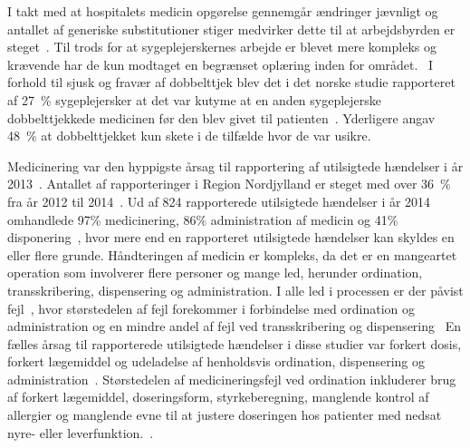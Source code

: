 I takt med at hospitalets medicin opgørelse gennemgår ændringer jævnligt og antallet af generiske  substitutioner stiger medvirker dette til at arbejdsbyrden er steget~\citep{Hakonsen2010}. Til trods for at sygeplejerskernes arbejde er blevet mere kompleks og krævende har de kun modtaget en begrænset oplæring inden for området.~\citep{Hakonsen2010} I forhold til sjusk og fravær af dobbelttjek blev det i det norske studie rapporteret af 27~\% sygeplejersker at det var kutyme at en anden sygeplejerske dobbelttjekkede medicinen før den blev givet til patienten~\citep{Hakonsen2010}. Yderligere angav 48~\% at dobbelttjekket kun skete i de tilfælde hvor de var usikre.~\citep{Hakonsen2010} 

Medicinering var den hyppigste årsag til rapportering af utilsigtede hændelser i år 2013~\citep{Patientombuddet2013}. Antallet af rapporteringer i Region Nordjylland er steget med over 36~\% fra år 2012 til 2014~\citep{Jensen2014}. Ud af 824 rapporterede utilsigtede hændelser i år 2014 omhandlede 97\% medicinering, 86\% administration af medicin og 41\% disponering~\citep{Jensen2014}, hvor mere end en rapporteret  utilsigtede hændelser kan skyldes en eller flere grunde. 
Håndteringen af medicin er kompleks, da det er en mangeartet operation som involverer flere personer og mange led, herunder ordination, transskribering, dispensering og administration. I alle led i processen er der påvist fejl~\citep{Barker2002,Sundhedsstyrelsen2005, Lisby2005, Tully2009}, hvor størstedelen af fejl forekommer i forbindelse med ordination og administration og en mindre andel af fejl ved transskribering og dispensering~\citep{Agrawal2009, Anderson2002} 
En fælles årsag til rapporterede utilsigtede hændelser i disse studier var forkert dosis, forkert lægemiddel og udeladelse af henholdsvis ordination, dispensering og administration~\citep{Barker2002,Sundhedsstyrelsen2005,Lisby2005, Tully2009}.
Størstedelen af medicineringsfejl ved ordination inkluderer brug af forkert lægemiddel, doseringsform, styrkeberegning, manglende kontrol af allergier og manglende evne til at justere doseringen hos patienter med nedsat nyre- eller leverfunktion.~\citep{Agrawal2009}.




